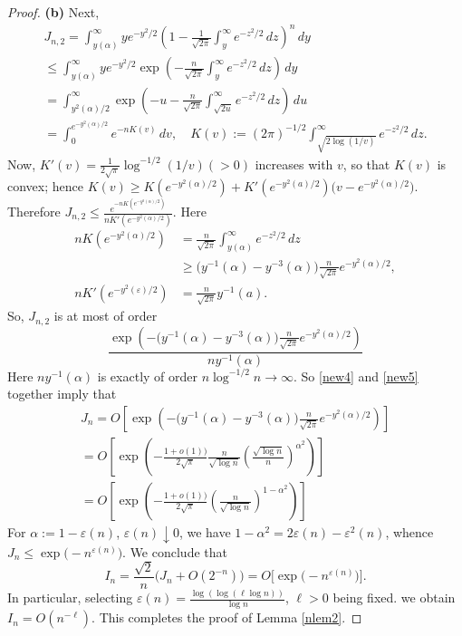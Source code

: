 \documentclass[11pt]{amsart}
\def\eps{\varepsilon}
\def\a{\alpha}
\theoremstyle{remark}
\numberwithin{equation}{section}
\begin{document}
\begin{proof}
{\bf (b)\/} Next,
\begin{multline*}
J_{n,2}=\int_{y(\a)}^{\infty}ye^{-y^2/2}\left(1-\frac{1}{\sqrt{2\pi}}\int_y^{\infty}e^{-z^2/2}\,dz\right)^n\,dy\\
\le \int_{y(\a)}^{\infty}ye^{-y^2/2}
\exp\left(-\frac{n}{\sqrt{2\pi}}\int_y^{\infty}e^{-z^2/2}\,dz\right)\,dy\\
=\int_{y^2(\a)/2}^{\infty}\exp\left(-u-\frac{n}{\sqrt{2\pi}}\int_{\sqrt{2u}}^{\infty}e^{-z^2/2}\,dz\right)\,du\\
=\int_{0}^{e^{-y^2(\a)/2}}e^{-nK(v)}\,dv, \quad K(v):=(2\pi)^{-1/2}\int_{\sqrt{2\log(1/v)}}^{\infty}e^{-z^2/2}\,dz.
\end{multline*}
Now, $K'(v)=\frac{1}{2\sqrt{\pi}}\log^{-1/2}(1/v)(>0)$ increases with $v$, so that $K(v)$ is convex; hence
$
K(v)\ge K(e^{-y^2(\a)/2})+K'(e^{-y^2(a)/2})\bigl(v-e^{-y^2(\a)/2}\bigr).
$
Therefore 
$
J_{n,2}\le \frac{e^{-nK(e^{-y^2(\a)/2})}}{nK'(e^{-y^2(\a)/2})}.
$
Here
\begin{align*}
nK(e^{-y^2(\a)/2})&=\frac{n}{\sqrt{2\pi}}\int_{y(\a)}^{\infty}e^{-z^2/2}\,dz\\
&\ge \bigl(y^{-1}(\a) -y^{-3}(\a)\bigr)\frac{n}{\sqrt{2\pi}}e^{-y^2(\a)/2},\\
nK'(e^{-y^2(\eps)/2})&=\frac{n}{\sqrt{2\pi}}y^{-1}(a).
\end{align*}
So, $J_{n,2}$ is at most of order
\begin{equation}\label{new5}
\frac{\exp\left(-\bigl(y^{-1}(\a) -y^{-3}(\a)\bigr)\frac{n}{\sqrt{2\pi}}e^{-y^2(\a)/2}\right)}{ny^{-1}(\a)}
\end{equation}
Here $ny^{-1}(\a)$ is exactly of order $n\log^{-1/2} n\to \infty$. So \eqref{new4} and \eqref{new5} together imply that 
\begin{multline*}
J_n=O\left[\exp\left(-\bigl(y^{-1}(\a)-y^{-3}(\a)\bigr)\frac{n}{\sqrt{2\pi}}e^{-y^2(\a)/2}\right)\right]\\
=O\left[\exp\left(-\frac{1+o(1))}{2\sqrt{\pi}}\frac{n}{\sqrt{\log n}}\left(\frac{\sqrt{\log n}}{n}\right)^{\a^2}\right)\right]\\
=O\left[\exp\left(-\frac{1+o(1))}{2\sqrt{\pi}}\left(\frac{n}{\sqrt{\log n}}\right)^{1-\a^2}\right)\right]
\end{multline*}
For $\a:=1- \eps(n)$, $\eps(n)\downarrow 0$, we have $1-\a^2=2\eps(n)-\eps^2(n)$, whence $J_n\le \exp\bigl(-n^{\eps(n)}\bigr)$.
We conclude that
\[
I_n=\frac{\sqrt{2}}{n}\bigl(J_n+O(2^{-n})\bigr)=O\bigl[\exp\bigl(-n^{\eps(n)})\bigr].
\]
In particular, selecting $\eps(n)=\frac{\log(\log(\ell\log n))}{\log n}$, $\ell>0$ being fixed. we obtain $I_n=O(n^{-\ell})$. This completes the proof of Lemma \ref{nlem2}.
\end{proof}
\end{document}
